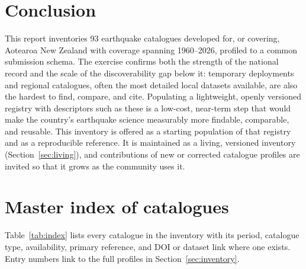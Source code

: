 \documentclass[10pt,a4paper]{article}
\begin{document}
\section{Conclusion}\label{sec:conclusion}
This report inventories 93 earthquake catalogues developed for, or covering, Aotearoa New Zealand with coverage spanning 1960--2026, profiled to a common submission schema. The exercise confirms both the strength of the national record and the scale of the discoverability gap below it: temporary deployments and regional catalogues, often the most detailed local datasets available, are also the hardest to find, compare, and cite. Populating a lightweight, openly versioned registry with descriptors such as these is a low-cost, near-term step that would make the country's earthquake science measurably more findable, comparable, and reusable. This inventory is offered as a starting population of that registry and as a reproducible reference. It is maintained as a living, versioned inventory (Section~\ref{sec:living}), and contributions of new or corrected catalogue profiles are invited so that it grows as the community uses it.
\appendix
\section{Master index of catalogues}\label{app:index}
Table~\ref{tab:index} lists every catalogue in the inventory with its period, catalogue type, availability, primary reference, and DOI or dataset link where one exists. Entry numbers link to the full profiles in Section~\ref{sec:inventory}.
\end{document}
